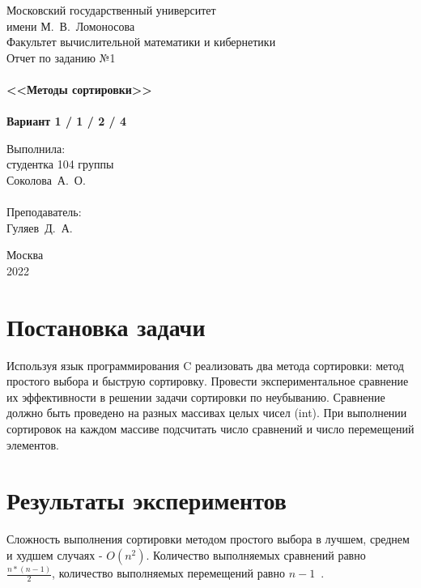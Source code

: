 \documentclass[a4paper,12pt,titlepage,finall]{article}
\begin{document}
\begin{titlepage}
    \begin{center}
	{\small \sc Московский государственный университет \\имени М.~В.~Ломоносова\\
	Факультет вычислительной математики и кибернетики\\}
	\vfill
	{\Large \sc Отчет по заданию №1}\\
	~\\
	{\large \bf <<Методы сортировки>>}\\ 
	~\\
	{\large \bf Вариант 1 / 1 / 2 / 4}
    \end{center}
    \begin{flushright}
	\vfill {Выполнила:\\
	студентка 104 группы\\
	Соколова~А.~О.\\
	~\\
	Преподаватель:\\
	Гуляев~Д.~А.}
    \end{flushright}
    \begin{center}
	\vfill
	{\small Москва\\2022}
    \end{center}
\end{titlepage}

\tableofcontents
\newpage

\section{Постановка задачи}

Используя язык программирования C реализовать два метода сортировки: метод простого выбора и быструю сортировку. Провести экспериментальное сравнение их эффективности в решении задачи сортировки по неубыванию. Сравнение должно быть проведено на разных массивах целых чисел (int). При выполнении сортировок на каждом массиве подсчитать число сравнений и число перемещений элементов.

\newpage

\section{Результаты экспериментов}

Сложность выполнения сортировки методом простого выбора в лучшем, среднем и худшем случаях - $O(n^2)$. Количество выполняемых сравнений равно $\frac{n*(n-1)}{2}$, количество выполняемых перемещений равно $n-1$~\cite{bookcs}.
\end{document}
